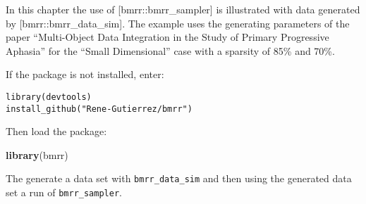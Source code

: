 \documentclass[
]{article}
\newenvironment{Shaded}{\begin{snugshade}}{\end{snugshade}}
\newcommand{\FunctionTok}[1]{\textcolor[rgb]{0.13,0.29,0.53}{\textbf{#1}}}
\newcommand{\NormalTok}[1]{#1}
\begin{document}
In this chapter the use of {[}bmrr::bmrr\_sampler{]} is illustrated with data
generated by {[}bmrr::bmrr\_data\_sim{]}. The example uses the generating parameters
of the paper ``Multi-Object Data Integration in the Study of Primary Progressive
Aphasia'' for the ``Small Dimensional'' case with a sparsity of 85\% and 70\%.

If the package is not installed, enter:

\begin{verbatim}
library(devtools)
install_github("Rene-Gutierrez/bmrr")
\end{verbatim}

Then load the package:

\begin{Shaded}
\begin{Highlighting}[]
\FunctionTok{library}\NormalTok{(bmrr)}
\end{Highlighting}
\end{Shaded}

The generate a data set with \texttt{bmrr\_data\_sim} and then using the generated data
set a run of \texttt{bmrr\_sampler}.
\end{document}
